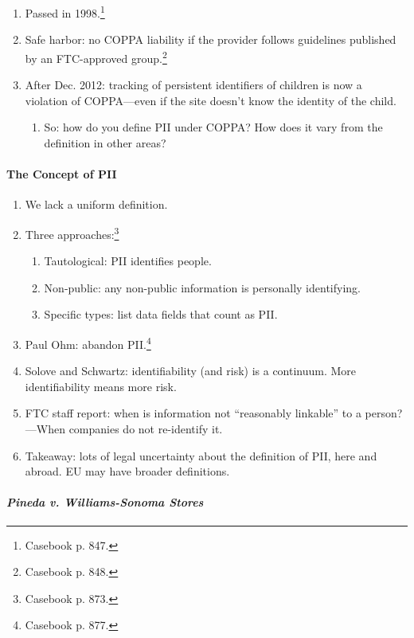 \begin{enumerate}
    \item Passed in 1998.\footnote{Casebook p. 847.}
    \item Safe harbor: no COPPA liability if the provider follows guidelines 
    published by an FTC-approved group.\footnote{Casebook p. 848.}
    \item After Dec. 2012: tracking of persistent identifiers of children is now 
    a violation of COPPA---even if the site doesn't know the identity of the 
    child.
    \begin{enumerate}
        \item So: how do you define PII under COPPA? How does it vary from the 
        definition in other areas?
    \end{enumerate}
\end{enumerate}

\paragraph{The Concept of PII}

\begin{enumerate}
    \item We lack a uniform definition.
    \item Three approaches:\footnote{Casebook p. 873.}
    \begin{enumerate}
        \item Tautological: PII identifies people.
        \item Non-public: any non-public information is personally identifying.
        \item Specific types: list data fields that count as PII.
    \end{enumerate}
    \item Paul Ohm: abandon PII.\footnote{Casebook p. 877.}
    \item Solove and Schwartz: identifiability (and risk) is a continuum. More 
    identifiability means more risk.
    \item FTC staff report: when is information not ``reasonably linkable'' to a 
    person?---When companies do not re-identify it.
    \item Takeaway: lots of legal uncertainty about the definition of PII, here 
    and abroad. EU may have broader definitions.
\end{enumerate}

\paragraph{\emph{Pineda v. Williams-Sonoma Stores}}

